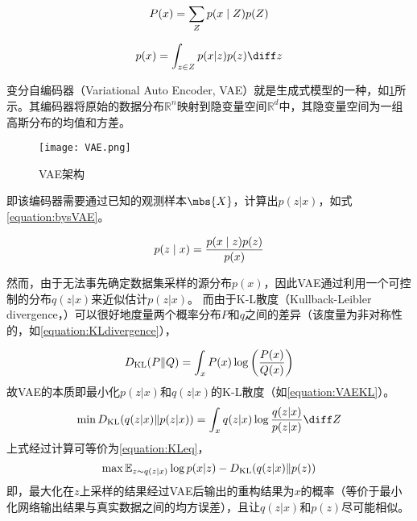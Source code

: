 \begin{equation}
  \centering
  \label{equation:GenerativeModel}
  P(x) = \sum_{Z}^{}p(x\mid Z)p(Z)
\end{equation}

\begin{equation}
  \centering
  \label{equation:GenerativeModelcon}
  p(x) = \int_{z \in Z}^{} p(x|z)p(z)\diff z
\end{equation}

变分自编码器（Variational Auto Encoder, VAE）就是生成式模型的一种，如\cref{figure:VAE}所示。其编码器将原始的数据分布$\mathbb{R}^n$映射到隐变量空间$\mathbb{R}^d$中，其隐变量空间为一组高斯分布的均值和方差。
\begin{figure}[h]
  \centering
  \texttt{[image: VAE.png]}
  \caption{VAE架构}
  \label{figure:VAE}
  \end{figure}

即该编码器需要通过已知的观测样本$\mbs{X}$，计算出$p(z|x)$，如式\cref{equation:bysVAE}。

\begin{equation}
  \centering
  \label{equation:bysVAE}
  p(z \mid x) = \frac{p(x \mid z)p(z)}{p(x)} 
\end{equation}

然而，由于无法事先确定数据集采样的源分布$p(x)$，因此VAE通过利用一个可控制的分布$q(z|x)$来近似估计$p(z|x)$。
而由于K-L散度（Kullback-Leibler divergence，）可以很好地度量两个概率分布$P$和$q$之间的差异（该度量为非对称性的，如\cref{equation:KLdivergence}），

\begin{equation}
  \centering
  \label{equation:KLdivergence}
  D_{\text{KL}}(P \| Q) = \int_{x} P(x) \log \left( \frac{P(x)}{Q(x)} \right)
\end{equation}
故VAE的本质即最小化$p(z|x)$和$q(z|x)$的K-L散度（如\cref{equation:VAEKL}）。
\begin{equation}
  \centering
  \label{equation:VAEKL}
  \min D_{\text{KL}}(q(z|x)\|p(z|x)) = \int_{x}q(z|x)\log \frac{q(z|x)}{p(z|x)}\diff Z
\end{equation}
上式经过计算可等价为\cref{equation:KLeq}，
\begin{equation}
  \centering
  \max  \mathbb{E}_{z\sim q(z|x)} \log p(x|z) - D_{\text{KL}}(q(z|x)\|p(z))
  \label{equation:KLeq}
\end{equation}
即，最大化在$z$上采样的结果经过VAE后输出的重构结果为$x$的概率（等价于最小化网络输出结果与真实数据之间的均方误差），且让$q(z|x)$和$p(z)$尽可能相似。


